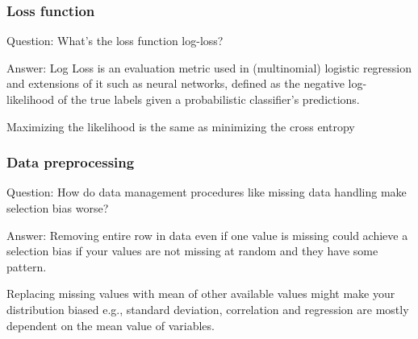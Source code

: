\documentclass[11pt]{beamer}
\begin{document}
\begin{frame}
\frametitle{Loss function}
\begin{block}{Question:}
	What’s the loss function log-loss?
\end{block}
\begin{block}{Answer:}
	Log Loss is an evaluation metric used in (multinomial) logistic regression and extensions of it such as neural networks, defined as the negative log-likelihood of the true labels given a probabilistic classifier’s predictions.
	
	Maximizing the likelihood is the same as minimizing the cross entropy
\end{block}
\end{frame}

\begin{frame}
\frametitle{Data preprocessing} 
\begin{block}{Question:}
	How do data management procedures like missing data handling make selection bias worse?
\end{block}
\begin{block}{Answer:}
	Removing entire row in data even if one value is missing could achieve a selection bias if your values are not missing at random and they have some pattern. 
	
	Replacing missing values with mean of other available values might make your distribution biased e.g., standard deviation, correlation and regression are mostly dependent on the mean value of variables.
\end{block}
\end{frame}
\end{document}
